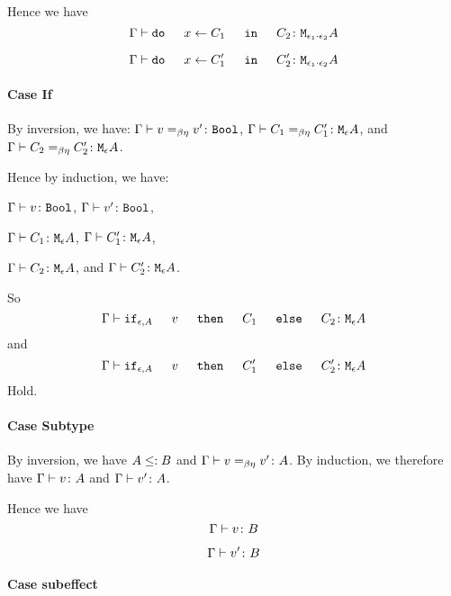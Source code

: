 \documentclass{report}
\begin{document}
        Hence we have 
        \begin{equation}
            \gtyperelation{\doin{x}{C_1}{C_2}}{\M{\e_1\dot\e_2}{A}}
        \end{equation}

        
        \begin{equation}
            \gtyperelation{\doin{x}{C_1'}{C_2'}}{\M{\e_1\dot\e_2}{A}}
        \end{equation}
    \paragraph{Case If}
    By inversion, we have:
    $\Gamma \vdash v =_{\beta\eta} v' \colon \texttt{Bool}$,
    $\Gamma \vdash C_1 =_{\beta\eta} C_1' \colon \texttt{M}_{\epsilon}{A}$, and
    $\Gamma \vdash C_2 =_{\beta\eta} C_2' \colon \texttt{M}_{\epsilon}{A}$.

    Hence by induction, we have:

    $\Gamma \vdash v \colon \texttt{Bool}$,
    $\Gamma \vdash v' \colon \texttt{Bool}$,

    $\Gamma \vdash C_1 \colon \texttt{M}_{\epsilon}{A}$,
    $\Gamma \vdash C_1' \colon \texttt{M}_{\epsilon}{A}$,

    
    $\Gamma \vdash C_2 \colon \texttt{M}_{\epsilon}{A}$, and
    $\Gamma \vdash C_2' \colon \texttt{M}_{\epsilon}{A}$.

    So 
    \begin{equation}
        \gtyperelation{\ifthenelse{\e}{A}{v}{C_1}{C_2}}{\mea}
    \end{equation}
    and
    \begin{equation}
        \gtyperelation{\ifthenelse{\e}{A}{v}{C_1'}{C_2'}}{\mea}
    \end{equation}
    Hold.
    \paragraph{Case Subtype}

    By inversion, we have $A \leq: B$ and $\Gamma \vdash v =_{\beta\eta} v' \colon A$. By induction, we therefore have $\Gamma \vdash v \colon A$ and $\Gamma \vdash v' \colon A$.

    Hence we have 
    \begin{equation}
        \Gamma \vdash v \colon B
    \end{equation}

    
    \begin{equation}
        \Gamma \vdash v' \colon B
    \end{equation}
    \paragraph{Case subeffect}
\end{document}
